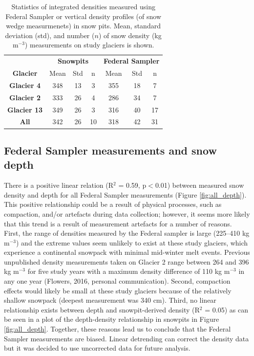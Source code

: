 \documentclass[12pt]{article}
\begin{document}
\begin{table}[h!]
\centering
\caption{Statistics of integrated densities measured using Federal Sampler or vertical density profiles (of snow wedge measurmenets) in snow pits. Mean, standard deviation (std), and number ($n$) of snow density (kg m$^{-3}$) measurements on study glaciers is shown.}
\label{tab:density_stats}
\begin{tabular}{c|ccc|ccc}
 & \multicolumn{3}{c}{\textbf{Snowpits}} & \multicolumn{3}{|c}{\textbf{Federal Sampler}} \\
\multirow{-2}{*}{\textbf{Glacier}} & Mean & Std & n & Mean & Std & n \\ \hline \hline
\textbf{Glacier 4} & 348 & 13 & 3 & 355 & 18 & 7 \\
\textbf{Glacier 2} & 333 & 26 & 4 & 286 & 34 & 7 \\
\textbf{Glacier 13} & 349 & 26 & 3 & 316 & 40 & 17 \\  \hline
\textbf{All} & 342 & 26 & 10 & 318 & 42 & 31
\end{tabular}
\end{table}

\subsection{Federal Sampler measurements and snow depth}

There is a positive linear relation (R$^2$ = 0.59, p$<$0.01) between measured snow density and depth for all Federal Sampler measurements (Figure \ref{fig:all_depth}). This positive relationship could be a result of physical processes, such as compaction, and/or artefacts during data collection; however, it seems more likely that this trend is a result of measurement artefacts for a number of reasons. First, the range of densities measured by the Federal sampler is large (225--410 kg m$^{-3}$) and the extreme values seem unlikely to exist at these study glaciers, which experience a continental snowpack with minimal mid-winter melt events. Previous unpublished density measurements taken on Glacier 2 range between 264 and 396 kg m$^{-3}$ for five study years with a maximum density difference of 110 kg m$^{-3}$ in any one year (Flowers, 2016, personal communication). Second, compaction effects would likely be small at these study glaciers because of the relatively shallow snowpack (deepest measurement was 340 cm). Third, no linear relationship exists between depth and snowpit-derived density (R$^2$ = 0.05) as can be seen in a plot of the depth-density relationship in snowpits in Figure \ref{fig:all_depth}. Together, these reasons lead us to conclude that the Federal Sampler measurements are biased. Linear detrending can correct the density data but it was decided to use uncorrected data for future analysis.
\end{document}
